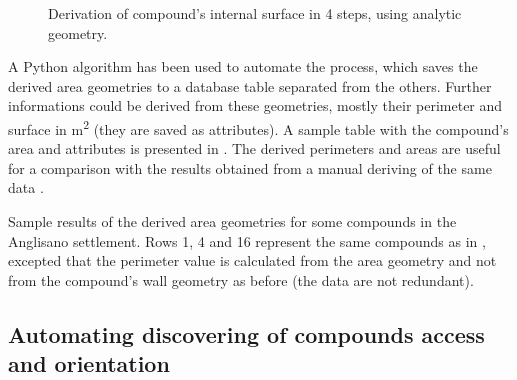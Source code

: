 \begin{figure}

                \caption[Derivation of compound's internal surface using analytic geometry]{Derivation of compound's internal surface in 4 steps, using analytic geometry.}
                \label{fig:comp-iter}
            \end{figure}
            
            A Python algorithm has been used to automate the process, which saves the derived area geometries to a database table separated from the others. Further informations could be derived from these geometries, mostly their perimeter and surface in \si{\meter\squared} (they are saved as attributes). A sample table with the compound's area and attributes is presented in . The derived perimeters and areas are useful for a comparison with the results obtained from a manual deriving of the same data %
            .

            \begin{table}
                \centering
                
                \caption[Sample results of area geometries derived from compounds and their attributes for the Anglisano settlement.]{Sample results of the derived area geometries for some compounds in the Anglisano settlement. Rows 1, 4 and 16 represent the same compounds as in , excepted that the perimeter value is calculated from the area geometry and not from the compound's wall geometry as before (the data are not redundant).}
                \label{tab:tab-area-anglisano}
            \end{table}

        \subsection{Automating discovering of compounds access and orientation}

